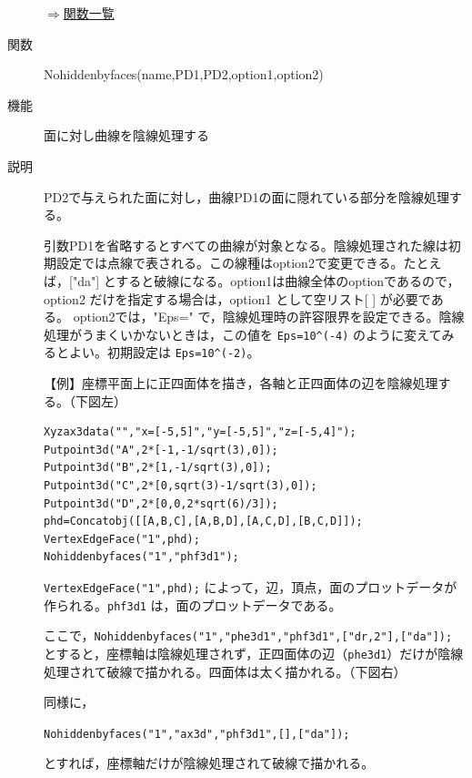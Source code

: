 \documentclass[papersize,a4paper,12pt,uplatex]{jsarticle}
\begin{document}
\begin{description}
\begin{flushright} \hyperlink{functionlist}{$\Rightarrow$関数一覧}\end{flushright}

\hypertarget{nohiddenbyfaces}{}
\item[関数]  Nohiddenbyfaces(name,PD1,PD2,option1,option2)
\item[機能]  面に対し曲線を陰線処理する
\item[説明]  PD2で与えられた面に対し，曲線PD1の面に隠れている部分を陰線処理する。

引数PD1を省略するとすべての曲線が対象となる。陰線処理された線は初期設定では点線で表される。この線種はoption2で変更できる。たとえば，["da"] とすると破線になる。option1は曲線全体のoptionであるので，option2 だけを指定する場合は，option1 として空リスト[ ] が必要である。
option2では，"Eps=" で，陰線処理時の許容限界を設定できる。陰線処理がうまくいかないときは，この値を \verb|Eps=10^(-4)| のように変えてみるとよい。初期設定は \verb|Eps=10^(-2)|。

\vspace{\baselineskip}
【例】座標平面上に正四面体を描き，各軸と正四面体の辺を陰線処理する。（下図左）
\begin{verbatim}
Xyzax3data("","x=[-5,5]","y=[-5,5]","z=[-5,4]");
Putpoint3d("A",2*[-1,-1/sqrt(3),0]);
Putpoint3d("B",2*[1,-1/sqrt(3),0]);
Putpoint3d("C",2*[0,sqrt(3)-1/sqrt(3),0]);
Putpoint3d("D",2*[0,0,2*sqrt(6)/3]);
phd=Concatobj([[A,B,C],[A,B,D],[A,C,D],[B,C,D]]);
VertexEdgeFace("1",phd);
Nohiddenbyfaces("1","phf3d1"); 
\end{verbatim}

  \verb|VertexEdgeFace("1",phd);| によって，辺，頂点，面のプロットデータが作られる。\verb|phf3d1| は，面のプロットデータである。
  
ここで，\verb|Nohiddenbyfaces("1","phe3d1","phf3d1",["dr,2"],["da"]); | とすると，座標軸は陰線処理されず，正四面体の辺（\verb|phe3d1|）だけが陰線処理されて破線で描かれる。四面体は太く描かれる。（下図右）
  
\vspace{\baselineskip}
  \begin{center}      \end{center}
同様に，

  \verb|Nohiddenbyfaces("1","ax3d","phf3d1",[],["da"]);|
  
とすれば，座標軸だけが陰線処理されて破線で描かれる。


\end{description}
\end{document}
